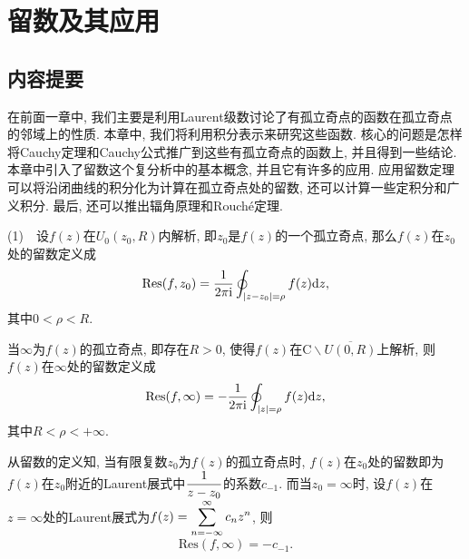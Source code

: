 
\chapter{留数及其应用}

\section{内容提要}
	在前面一章中, 我们主要是利用Laurent级数讨论了有孤立奇点的函数在孤立奇点的邻域上的性质. 本章中, 我们将利用积分表示来研究这些函数. 核心的问题是怎样将Cauchy定理和Cauchy公式推广到这些有孤立奇点的函数上, 并且得到一些结论. 本章中引入了留数这个复分析中的基本概念, 并且它有许多的应用. 应用留数定理可以将沿闭曲线的积分化为计算在孤立奇点处的留数, 还可以计算一些定积分和广义积分. 最后, 还可以推出辐角原理和Rouché定理.

	(1)~~设$f(z)$在$U_0(z_0,R)$内解析, 即$z_0$是$f(z)$的一个孤立奇点, 那么$f(z)$在$z_0$处的留数定义成
	\begin{equation*}
		\mathrm{Res}(f,z_0) = \frac{1}{2\pi\mathrm{i}}\oint_{\lvert z-z_0\rvert=\rho}f(z)\mathrm{d}z,
	\end{equation*}
	其中$0<\rho<R$.
	
	当$\infty$为$f(z)$的孤立奇点, 即存在$R>0$, 使得$f(z)$在$\mathrm{C}\backslash \overline{U(0,R)}$上解析, 则$f(z)$在$\infty$处的留数定义成\begin{equation*}
		\mathrm{Res}(f,\infty) = -\frac{1}{2\pi\mathrm{i}}\oint_{\lvert z\rvert=\rho}f(z)\mathrm{d}z,
	\end{equation*}
	其中$R<\rho<+\infty$.

	从留数的定义知, 当有限复数$z_0$为$f(z)$的孤立奇点时, $f(z)$在$z_0$处的留数即为$f(z)$在$z_0$附近的Laurent展式中$\begin{lgathered}
		\frac{1}{z-z_0}
	\end{lgathered}$的系数$c_{-1}$. 而当$z_0 = \infty$时, 设$f(z)$在$z = \infty$处的Laurent展式为$\begin{lgathered}
		f(z) = \sum_{n = -\infty}^{\infty}c_nz^n
	\end{lgathered}$, 则\begin{equation*}
		\mathrm{Res}(f,\infty) = -c_{-1}.
	\end{equation*}
	
